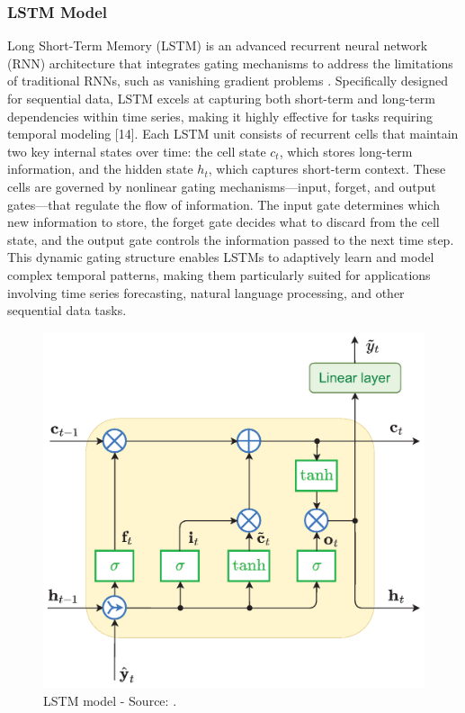 \documentclass{dsfe}
\begin{document}
\subsubsection{LSTM Model}
Long Short-Term Memory (LSTM) is an advanced recurrent neural network (RNN) architecture that integrates gating mechanisms to address the limitations of traditional RNNs, such as vanishing gradient problems \citep{hochreiter97}. Specifically designed for sequential data, LSTM excels at capturing both short-term and long-term dependencies within time series, making it highly effective for tasks requiring temporal modeling [14]. Each LSTM unit consists of recurrent cells that maintain two key internal states over time: the cell state $c_t$, which stores long-term information, and the hidden state $h_t$, which captures short-term context. These cells are governed by nonlinear gating mechanisms—input, forget, and output gates—that regulate the flow of information. The input gate determines which new information to store, the forget gate decides what to discard from the cell state, and the output gate controls the information passed to the next time step. This dynamic gating structure enables LSTMs to adaptively learn and model complex temporal patterns, making them particularly suited for applications involving time series forecasting, natural language processing, and other sequential data tasks.
\begin{figure}[H]
\begin{center}
\includegraphics[scale=0.2]{lstmCell.png}
\caption{LSTM model - Source: \citep{dudek2023}.}\label{lstm_cell}
\end{center}
\end{figure}
\end{document}

